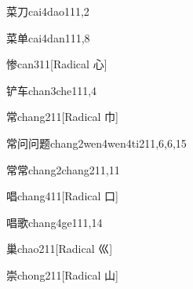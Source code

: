 \begin{verbete}{菜刀}{cai4dao1}{11,2}
\end{verbete}

\begin{verbete}{菜单}{cai4dan1}{11,8}
\end{verbete}

\begin{verbete}{惨}{can3}{11}[Radical 心]
\end{verbete}

\begin{verbete}{铲车}{chan3che1}{11,4}
\end{verbete}

\begin{verbete}{常}{chang2}{11}[Radical 巾]
\end{verbete}

\begin{verbete}{常问问题}{chang2wen4wen4ti2}{11,6,6,15}
\end{verbete}

\begin{verbete}{常常}{chang2chang2}{11,11}
\end{verbete}

\begin{verbete}{唱}{chang4}{11}[Radical ⼝]
\end{verbete}

\begin{verbete}{唱歌}{chang4ge1}{11,14}
\end{verbete}

\begin{verbete}{巢}{chao2}{11}[Radical ⼮]
\end{verbete}

\begin{verbete}{崇}{chong2}{11}[Radical ⼭]
\end{verbete}

